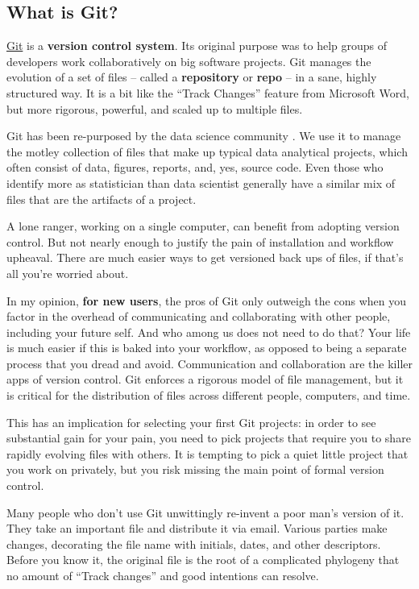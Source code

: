 \documentclass[12pt]{article}
\begin{document}
\subsection{What is Git?}\label{what-is-git}

\href{http://git-scm.com}{Git} is a \textbf{version control system}. Its
original purpose was to help groups of developers work collaboratively
on big software projects. Git manages the evolution of a set of files --
called a \textbf{repository} or \textbf{repo} -- in a sane, highly
structured way. It is a bit like the ``Track Changes'' feature from
Microsoft Word, but more rigorous, powerful, and scaled up to multiple
files.

Git has been re-purposed by the data science community
\citep{Ram2013, git-for-humans, ten-simple-rules-git}. We use it to
manage the motley collection of files that make up typical data
analytical projects, which often consist of data, figures, reports, and,
yes, source code. Even those who identify more as statistician than data
scientist generally have a similar mix of files that are the artifacts
of a project.

A lone ranger, working on a single computer, can benefit from adopting
version control. But not nearly enough to justify the pain of
installation and workflow upheaval. There are much easier ways to get
versioned back ups of files, if that's all you're worried about.

In my opinion, \textbf{for new users}, the pros of Git only outweigh the
cons when you factor in the overhead of communicating and collaborating
with other people, including your future self. And who among us does not
need to do that? Your life is much easier if this is baked into your
workflow, as opposed to being a separate process that you dread and
avoid. Communication and collaboration are the killer apps of version
control. Git enforces a rigorous model of file management, but it is
critical for the distribution of files across different people,
computers, and time.

This has an implication for selecting your first Git projects: in order
to see substantial gain for your pain, you need to pick projects that
require you to share rapidly evolving files with others. It is tempting
to pick a quiet little project that you work on privately, but you risk
missing the main point of formal version control.

Many people who don't use Git unwittingly re-invent a poor man's version
of it. They take an important file and distribute it via email. Various
parties make changes, decorating the file name with initials, dates, and
other descriptors. Before you know it, the original file is the root of
a complicated phylogeny that no amount of ``Track changes'' and good
intentions can resolve.
\end{document}
